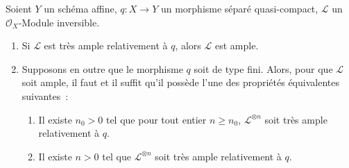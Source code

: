 \begin{proposition}[4.5.10]
\label{II.4.5.10-fr}
Soient $Y$ un schéma affine, $q:X\to Y$ un morphisme séparé quasi-compact,
$\mathcal{L}$ un $\mathcal{O}_X$-Module inversible.
\begin{enumerate}
  \item[\rm{(i)}] Si $\mathcal{L}$ est très ample relativement à $q$, alors
  $\mathcal{L}$ est ample.
  \item[\rm{(ii)}] Supposons en outre que le morphisme $q$ soit de type fini.
  Alors, pour que $\mathcal{L}$ soit ample, il faut et il suffit qu'il possède
  l'une des propriétés équivalentes suivantes~:
  \begin{enumerate}
    \item[\rm{e)}] Il existe $n_0>0$ tel que pour tout entier $n\geq n_0$,
    $\mathcal{L}^{\otimes n}$ soit très ample relativement à $q$.
    \item[\rm{e')}] Il existe $n>0$ tel que $\mathcal{L}^{\otimes n}$ soit
    très ample relativement à $q$.
  \end{enumerate}
\end{enumerate}
\end{proposition}

